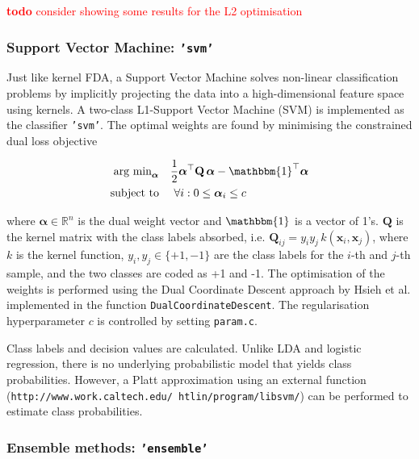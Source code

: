 \documentclass[utf8]{frontiersSCNS} %
\newcommand{\al}{\boldsymbol{\alpha}}
\newcommand{\x}{\mathbf{x}}
\newcommand{\Q}{\mathbf{Q}}
\newcommand{\R}{\mathbb{R}}
\newcommand{\ttt}[1]{\texttt{#1}}
\newcommand{\todo}[1]{\textcolor{red}{\textbf{todo} #1}}
\begin{document}
\todo{consider showing some results for the L2 optimisation}


\subsubsection{Support Vector Machine: \ttt{'svm'}}

Just like kernel FDA, a Support Vector Machine solves non-linear classification problems by implicitly projecting the data into a high-dimensional feature space using kernels.
A two-class L1-Support Vector Machine (SVM) is implemented as the classifier \ttt{'svm'}.
The optimal weights are found by minimising the constrained dual loss objective

\begin{align}
\begin{split}
\label{eq:svm_dual_loss_function}
\text{arg min}_{\al}\quad
& \frac{1}{2} \al^\top\Q\,\al - \mathbbm{1}^\top\al\\
\text{subject to}\quad  &\ \forall i: 0 \le \al_i \le c
\end{split}
\end{align}

where $\al\in\R^n$ is the dual weight vector and  $\mathbbm{1}$ is a vector of 1's. $\Q$ is the kernel matrix with the class labels absorbed, i.e. $\Q_{ij} = y_i y_j\, k(\x_i,\x_j)$, where $k$ is the kernel function, $y_i, y_j \in\{+1, -1\}$ are the class labels for the $i$-th and $j$-th sample, and the two classes are coded as +1 and -1. The optimisation of the weights is performed using the Dual Coordinate Descent
approach by Hsieh et al. \cite{Hsieh2008ASVM} implemented in the function \ttt{DualCoordinateDescent}. The regularisation hyperparameter $c$ is controlled by setting \ttt{param.c}.


Class labels and decision values are calculated. Unlike LDA and logistic regression,
there is no underlying probabilistic model that yields class probabilities.
However, a Platt approximation using an external function (\ttt{http://www.work.caltech.edu/~htlin/program/libsvm/}) can be performed to estimate
class probabilities.


\subsubsection{Ensemble methods: \ttt{'ensemble'}}
\end{document}
